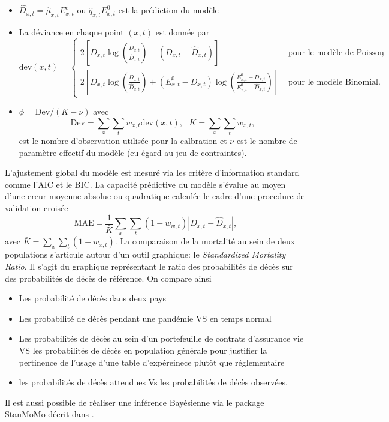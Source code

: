 \begin{itemize}
  \item $\widehat{D}_{x,t} = \widehat{\mu}_{x,t}E_{x,t}^c\text{ ou }\widehat{q}_{x,t}E_{x,t}^0$ est la prédiction du modèle
  \item La déviance en chaque point $(x,t)$ est donnée par
  $$
      \text{dev}(x,t)=\begin{cases}
      2\left[D_{x,t}\log\left(\frac{D_{x,t}}{\widehat{D}_{x,t}}\right)- (D_{x,t} - \widehat{D}_{x,t})\right]&\text{ pour le modèle de Poisson},\\
      2\left[D_{x,t}\log\left(\frac{D_{x,t}}{\widehat{D}_{x,t}}\right)+(E_{x,t}^0 - D_{x,t})\log\left(\frac{E^{0}_{x,t} - D_{x,t}}{E^{0}_{x,t} - \widehat{D}_{x,t}}\right)\right]&\text{ pour le modèle Binomial}.
    
      \end{cases}
      $$
  
  \item $\phi =\text{Dev}/ (K - \nu)$ avec 
  $$
\text{Dev} = \sum_x\sum_tw_{x,t}\text{dev}(x,t),\text{ }K = \sum_{x}\sum_tw_{x,t},
  $$
  est le nombre d'observation utilisée pour la calbration et $\nu$ est le nombre de paramètre effectif du modèle (eu égard au jeu de contraintes).
\end{itemize}
L'ajustement global du modèle est mesuré via les critère d'information standard comme l'AIC et le BIC. La capacité prédictive du modèle s'évalue au moyen d'une ereur moyenne absolue ou quadratique calculée le cadre d'une procedure de validation croisée 
$$
\text{MAE} = \frac{1}{\bar{K}}\sum_x\sum_{t}(1-w_{w,t}) |D_{x,t} - \widehat{D}_{x,t}|,
$$
avec $\bar{K} = \sum_{x}\sum_{t}(1-w_{x,t})$. La comparaison de la mortalité au sein de deux populations s'articule autour d'un outil graphique: le \textit{Standardized Mortality Ratio}. Il s'agit du graphique représentant le ratio des probabilités de décès sur des probabilités de décès de référence. On compare ainsi
\begin{itemize}
  \item Les probabilité de décès dans deux pays
  \item Les probabilité de décès pendant une pandémie VS en temps normal
  \item Les probabilités de décès au sein d'un portefeuille de contrats d'assurance vie VS les probabilités de décès en population générale pour justifier la pertinence de l'usage d'une table d'expéreinece plutôt que réglementaire
  \item les probabilités de décès attendues Vs les probabilités de décès observées.
  \end{itemize}
\begin{remark}
Il est aussi possible de réaliser une inférence Bayésienne via le package StanMoMo décrit dans \citet{Barigou2022}. 
\end{remark}